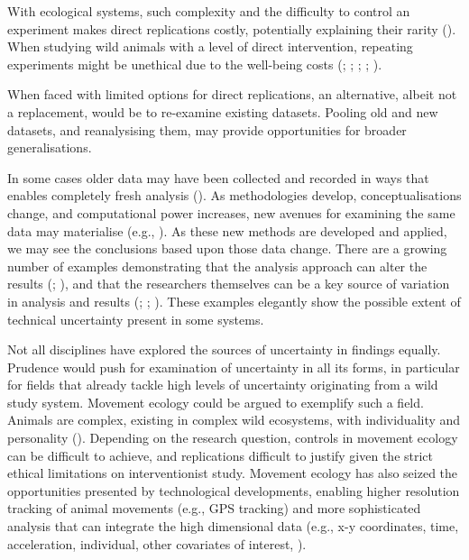 \documentclass[10pt,a4paper]{article}
\begin{document}
With ecological systems, such complexity and the difficulty to control an experiment makes direct replications costly, potentially explaining their rarity ().
When studying wild animals with a level of direct intervention, repeating experiments might be unethical due to the well-being costs (; ; ; ; ).

When faced with limited options for direct replications, an alternative, albeit not a replacement, would be to re-examine existing datasets.
Pooling old and new datasets, and reanalysising them, may provide opportunities for broader generalisations.

In some cases older data may have been collected and recorded in ways that enables completely fresh analysis ().
As methodologies develop, conceptualisations change, and computational power increases, new avenues for examining the same data may materialise (e.g., ).
As these new methods are developed and applied, we may see the conclusions based upon those data change.
There are a growing number of examples demonstrating that the analysis approach can alter the results (; ), and that the researchers themselves can be a key source of variation in analysis and results (; ; ).
These examples elegantly show the possible extent of technical uncertainty present in some systems.

Not all disciplines have explored the sources of uncertainty in findings equally.
Prudence would push for examination of uncertainty in all its forms, in particular for fields that already tackle high levels of uncertainty originating from a wild study system.
Movement ecology could be argued to exemplify such a field.
Animals are complex, existing in complex wild ecosystems, with individuality and personality ().
Depending on the research question, controls in movement ecology can be difficult to achieve, and replications difficult to justify given the strict ethical limitations on interventionist study.
Movement ecology has also seized the opportunities presented by technological developments, enabling higher resolution tracking of animal movements (e.g., GPS tracking) and more sophisticated analysis that can integrate the high dimensional data (e.g., x-y coordinates, time, acceleration, individual, other covariates of interest, ).
\end{document}
